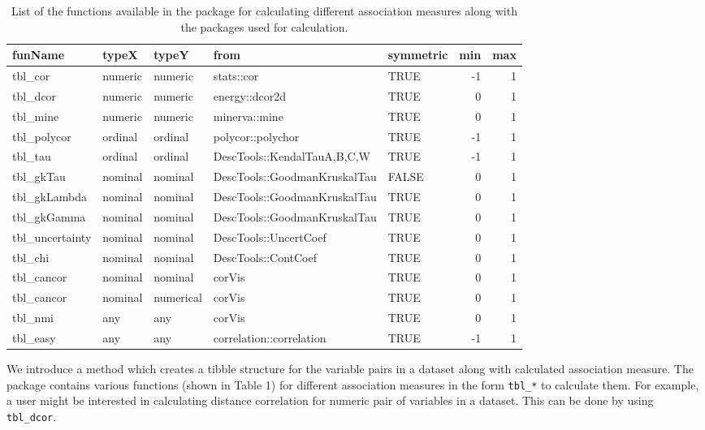 \begin{Schunk}
\begin{table}

\caption{\label{tab:association_measures}List of the functions available in the package for calculating different association measures along with the packages used for calculation.}
\centering
\begin{tabular}[t]{l|l|l|l|l|r|r}
\hline
funName & typeX & typeY & from & symmetric & min & max\\
\hline
tbl\_cor & numeric & numeric & stats::cor & TRUE & -1 & 1\\
\hline
tbl\_dcor & numeric & numeric & energy::dcor2d & TRUE & 0 & 1\\
\hline
tbl\_mine & numeric & numeric & minerva::mine & TRUE & 0 & 1\\
\hline
tbl\_polycor & ordinal & ordinal & polycor::polychor & TRUE & -1 & 1\\
\hline
tbl\_tau & ordinal & ordinal & DescTools::KendalTauA,B,C,W & TRUE & -1 & 1\\
\hline
tbl\_gkTau & nominal & nominal & DescTools::GoodmanKruskalTau & FALSE & 0 & 1\\
\hline
tbl\_gkLambda & nominal & nominal & DescTools::GoodmanKruskalTau & TRUE & 0 & 1\\
\hline
tbl\_gkGamma & nominal & nominal & DescTools::GoodmanKruskalTau & TRUE & 0 & 1\\
\hline
tbl\_uncertainty & nominal & nominal & DescTools::UncertCoef & TRUE & 0 & 1\\
\hline
tbl\_chi & nominal & nominal & DescTools::ContCoef & TRUE & 0 & 1\\
\hline
tbl\_cancor & nominal & nominal & corVis & TRUE & 0 & 1\\
\hline
tbl\_cancor & nominal & numerical & corVis & TRUE & 0 & 1\\
\hline
tbl\_nmi & any & any & corVis & TRUE & 0 & 1\\
\hline
tbl\_easy & any & any & correlation::correlation & TRUE & -1 & 1\\
\hline
\end{tabular}
\end{table}

\end{Schunk}

We introduce a method which creates a tibble structure for the variable
pairs in a dataset along with calculated association measure. The
package contains various functions (shown in Table 1) for different
association measures in the form \texttt{tbl\_*} to calculate them. For
example, a user might be interested in calculating distance correlation
for numeric pair of variables in a dataset. This can be done by using
\texttt{tbl\_dcor}.

